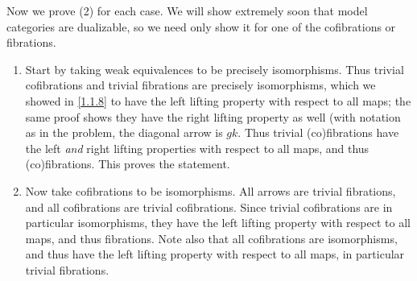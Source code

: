 \begin{example}
	Now we prove (2) for each case. We will show extremely soon that model categories are dualizable, so we need only show it for one of the cofibrations or fibrations.
	\begin{enumerate}
		\item Start by taking weak equivalences to be precisely isomorphisms. Thus trivial cofibrations and trivial fibrations are precisely isomorphisms, which we showed in \cref{1.1.8} to have the left lifting property with respect to all maps; the same proof shows they have the right lifting property as well (with notation as in the problem, the diagonal arrow is $gk$. Thus trivial (co)fibrations have the left \emph{and} right lifting properties with respect to all maps, and thus (co)fibrations. This proves the statement.
		\item Now take cofibrations to be isomorphisms. All arrows are trivial fibrations, and all cofibrations are trivial cofibrations. Since trivial cofibrations are in particular isomorphisms, they have the left lifting property with respect to all maps, and thus fibrations. Note also that all cofibrations are isomorphisms, and thus have the left lifting property with respect to all maps, in particular trivial fibrations.
	\end{enumerate}
	

\end{example}
